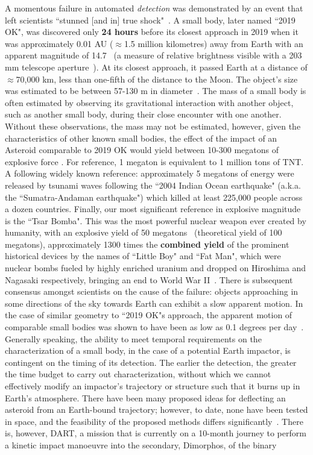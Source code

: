 A momentous failure in automated \textit{detection} was demonstrated by an event that left scientists {``stunned [and in] true shock"}~\cite{chiu_2019}. A small body, later named ``2019 OK",  was discovered only \textbf{24 hours} before its closest approach in 2019 when it was approximately 0.01 AU ($\approx$1.5 million kilometres) away from Earth with an apparent magnitude of 14.7~\cite{IAU2019OK} (a measure of relative brightness visible with a 203 mm telescope aperture~\cite[p.~24]{North2014}). At its closest approach, it passed  Earth at a distance of $\approx$70,000 km, less than one-fifth of the distance to the Moon. The object's size was estimated to be between 57-130 m in diameter~\cite{NASA2019}. The mass of a small body is often estimated by observing its gravitational interaction with another object, such as another small body, during their close encounter with one another. Without these observations, the mass may not be estimated, however, given the characteristics of other known small bodies, the effect of the impact of an Asteroid comparable to 2019 OK would yield between 10-300 megatons of explosive force \cite{Cellino1999, Rumpf2017}. For reference, 1 megaton is equivalent to 1 million tons of TNT. A following widely known reference: approximately 5 megatons of energy were released by tsunami waves following the ``2004 Indian Ocean earthquake" (a.k.a. the ``Sumatra-Andaman earthquake") \cite{Nirupama2006} which killed at least 225,000 people across a dozen countries. Finally, our most significant reference in explosive magnitude is the ``Tsar Bomba". This was the most powerful nuclear weapon ever created by humanity, with an explosive yield of 50 megatons~\cite{Khan2020} (theoretical yield of 100 megatons), approximately 1300 times the \textbf{combined yield} of the prominent historical devices by the names of ``Little Boy" and ``Fat Man", which were nuclear bombs fueled by highly enriched uranium and dropped on Hiroshima and Nagasaki respectively, bringing an end to World War II~\cite{osti_1489669}. There is subsequent consensus amongst scientists on the cause of the failure: objects approaching in some directions of the sky towards Earth can exhibit a slow apparent motion. In the case of similar geometry to ``2019 OK"s approach, the apparent motion of comparable small bodies was shown to have been as low as 0.1 degrees per day~\cite{Wainscoat2022}. Generally speaking, the ability to meet temporal requirements on the characterization of a small body, in the case of a potential Earth impactor, is contingent on the timing of its detection. The earlier the detection, the greater the time budget to carry out characterization, without which we cannot effectively modify an impactor's trajectory or structure such that it burns up in Earth's atmosphere. There have been many proposed ideas for deflecting an asteroid from an Earth-bound trajectory; however, to date, none have been tested in space, and the feasibility of the proposed methods differs significantly~\cite{Harris2015}. There is, however,  \gls{DART}, a mission that is currently on a 10-month journey to perform a kinetic impact manoeuvre into the secondary, Dimorphos, of the binary 
